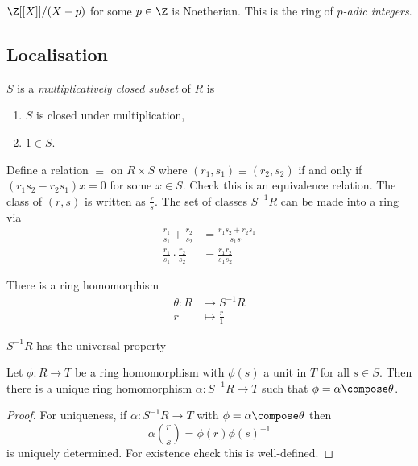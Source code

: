 \documentclass[a4paper]{article}
\begin{document}
\begin{eg}
  \(\Z[[X]]/(X - p)\) for some \(p \in \Z\) is Noetherian. This is the ring of \emph{\(p\)-adic integers}.
\end{eg}

\subsection{Localisation}

\begin{definition}
  \(S\) is a \emph{multiplicatively closed subset} of \(R\) is
  \begin{enumerate}
  \item \(S\) is closed under multiplication,
  \item \(1 \in S\).
  \end{enumerate}
\end{definition}

Define a relation \(\equiv\) on \(R \times S\) where \((r_1, s_1) \equiv (r_2, s_2)\) if and only if \((r_1s_2 - r_2s_1) x = 0\) for some \(x \in S\). Check this is an equivalence relation. The class of \((r, s)\) is written as \(\frac{r}{s}\). The set of classes \(S^{-1}R\) can be made into a ring via
\begin{align*}
  \frac{r_1}{s_1} + \frac{r_2}{s_2} &= \frac{r_1s_2 + r_2s_1}{s_1s_1} \\
  \frac{r_1}{s_1} \cdot \frac{r_2}{s_2} &= \frac{r_1r_2}{s_1s_2}
\end{align*}

There is a ring homomorphism
\begin{align*}
  \theta: R &\to S^{-1} R \\
  r &\mapsto \frac{r}{1}
\end{align*}

\(S^{-1}R\) has the universal property

\begin{lemma}
  Let \(\phi: R \to T\) be a ring homomorphism with \(\phi(s)\) a unit in \(T\) for all \(s \in S\). Then there is a unique ring homomorphism \(\alpha: S^{-1}R \to T\) such that \(\phi = \alpha \compose \theta\).
\end{lemma}

\begin{proof}
  For uniqueness, if \(\alpha: S^{-1}R \to T\) with \(\phi = \alpha \compose \theta\) then
  \[
    \alpha(\frac{r}{s}) = \phi(r) \phi(s)^{-1}
  \]
  is uniquely determined. For existence check this is well-defined.
\end{proof}
\end{document}
